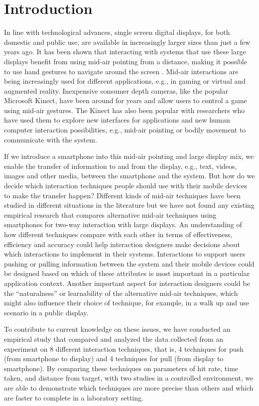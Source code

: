 \section{Introduction} \label{sec:introduction}
In line with technological advances, single screen digital displays, for both domestic and public use, are available in increasingly larger sizes than just a few years ago.
It has been shown that interacting with systems that use these large displays benefit from using mid-air pointing from a distance, making it possible to use hand gestures to navigate around the screen \cite{Jakobsen:2015}.
Mid-air interactions are being increasingly used for different applications, e.g., in gaming or virtual and augmented reality.
Inexpensive consumer depth cameras, like the popular Microsoft Kinect, have been around for years and allow users to control a game using mid-air gestures.
The Kinect has also been popular with researchers who have used them to explore new interfaces for applications and new human computer interaction possibilities, e.g., mid-air pointing or bodily movement to communicate with the system.

If we introduce a smartphone into this mid-air pointing and large display mix, we enable the transfer of information to and from the display, e.g., text, videos, images and other media, between the smartphone and the system.
But how do we decide which interaction techniques people should use with their mobile devices to make the transfer happen? Different kinds of mid-air techniques have been studied in different situations in the literature but we have not found any existing empirical research that compares alternative mid-air techniques using smartphones for two-way interaction with large displays.
An understanding of how different techniques compare with each other in terms of effectiveness, efficiency and accuracy could help interaction designers make decisions about which interactions to implement in their systems.
Interactions to support users pushing or pulling information between the system and their mobile devices could be designed based on which of these attributes is most important in a particular application context.
Another important aspect for interaction designers could be the “naturalness” or learnability of the alternative mid-air techniques, which might also influence their choice of technique, for example, in a walk up and use scenario in a public display.

To contribute to current knowledge on these issues, we have conducted an empirical study that compared and analyzed the data collected from an experiment on 8 different interaction techniques, that is, 4 techniques for push (from smartphone to display) and 4 techniques for pull (from display to smartphone).
By comparing these techniques on parameters of hit rate, time taken, and distance from target, with two studies in a controlled environment, we are able to demonstrate which techniques are more precise than others and which are faster to complete in a laboratory setting.

